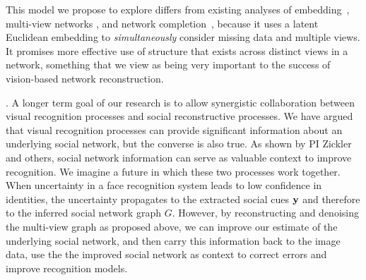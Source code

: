 This model we propose to explore differs from existing analyses of embedding~\cite{Hoff01latentspace,Hancocklatent}, multi-view networks \cite{AiroldiBFX08,Kim12}, and network completion~\cite{Clauset,Guimera,HannekeX09,KimL11}, because it uses a latent Euclidean embedding to \emph{simultaneously} consider missing data and multiple views. It promises more effective use of structure that exists across distinct views in a network, something that we view as being very important to the success of vision-based network reconstruction. 


\label{sec:closeloop}

. A longer term goal of our research is to allow synergistic collaboration between visual recognition processes and social reconstructive processes. We have argued that visual recognition processes can provide significant information about an underlying social network, but the converse is also true. As shown by PI Zickler~\cite{Stone2008,Stone2010} and others, social network information can serve as valuable context to improve recognition. We imagine a future in which these two processes work together. When uncertainty in a face recognition system leads to low confidence in identities, the uncertainty propagates to the extracted social cues ${\bf y}$ and therefore to the inferred social network graph $G$. However, by reconstructing and denoising the multi-view graph as proposed above, we can improve our estimate of the underlying social network, and then carry this information back to the image data, use the the improved social network as context to correct  errors and improve recognition models.
